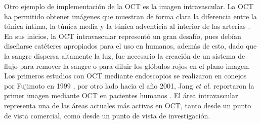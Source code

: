 Otro ejemplo de implementación de la OCT es la imagen intravascular. La OCT ha permitido obtener imágenes que muestran de forma clara la diferencia entre la túnica íntima, la túnica media y la túnica adventicia al interior de las arterias \cite{Tearney1996_2}. En sus inicios, la OCT intravascular \invivo representó un gran desafío, pues debían diseñarse catéteres apropiados para el uso en humanos, además de esto, dado que la sangre dispersa altamente la luz, fue necesario la creación de un sistema de flujo para remover la sangre o para diluir los glóbulos rojos en el plano imagen. Los primeros estudios con OCT mediante endoscopios se realizaron en conejos por Fujimoto \etal en 1999 \cite{Fujimoto1999}, por otro lado hacia el año 2001, Jang \emph{et al.} reportaron la primer imagen mediante OCT en pacientes humanos \cite{Jang2001}. El área intravascular representa una de las áreas actuales más activas en OCT, tanto desde un punto de vista comercial, como desde un punto de vista de investigación.






